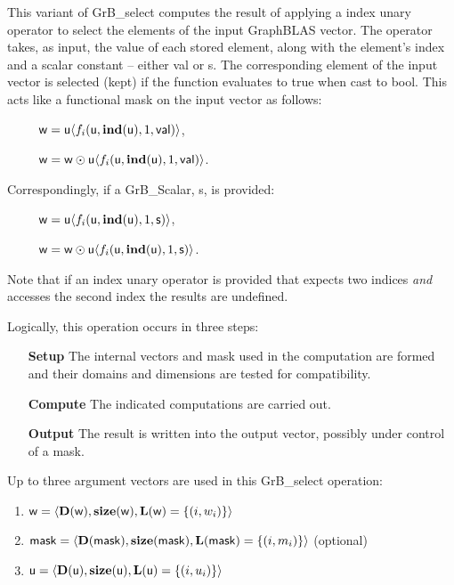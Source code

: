 This variant of {\sf GrB\_select} computes the result of applying a index unary operator
to select the elements of the input GraphBLAS vector.  The operator takes, as input,
the value of each stored element, along with the element's index and a scalar 
constant -- either {\sf val} or {\sf s}.  The corresponding element of the input vector is selected (kept)
if the function evaluates to {\sf true} when cast to {\sf bool}.  This acts like a
functional mask on the input vector as follows:
\begin{itemize}[leftmargin=2.1in]
\item[~] ${\sf w} = {\sf u}\langle f_i({\sf u}, \bold{ind}({\sf u}), 1, {\sf val})\rangle$,
\item[~] ${\sf w} = {\sf w} \odot {\sf u}\langle f_i({\sf u}, \bold{ind}({\sf u}), 1, {\sf val})\rangle$.  
\end{itemize}
{\color{red}
Correspondingly, if a {\sf GrB\_Scalar}, {\sf s}, is provided:
\begin{itemize}[leftmargin=2.1in]
\item[~] ${\sf w} = {\sf u}\langle f_i({\sf u}, \bold{ind}({\sf u}), 1, {\sf s})\rangle$,
\item[~] ${\sf w} = {\sf w} \odot {\sf u}\langle f_i({\sf u}, \bold{ind}({\sf u}), 1, {\sf s})\rangle$.  
\end{itemize}
}
Note that if an index unary operator is provided that expects two indices {\it and} 
accesses the second index the results are undefined.

Logically, this operation occurs in three steps:
\begin{enumerate}[leftmargin=0.75in]
\item[\bf Setup] The internal vectors and mask used in the computation are formed 
and their domains and dimensions are tested for compatibility.
\item[\bf Compute] The indicated computations are carried out.
\item[\bf Output] The result is written into the output vector, possibly under 
control of a mask.
\end{enumerate}

Up to three argument vectors are used in this {\sf GrB\_select} operation:
\begin{enumerate}
    \item ${\sf w} = \langle \bold{D}({\sf w}),\bold{size}({\sf w}),
    \bold{L}({\sf w}) = \{(i,w_i) \} \rangle$

    \item ${\sf mask} = \langle \bold{D}({\sf mask}),\bold{size}({\sf mask}),
    \bold{L}({\sf mask}) = \{(i,m_i) \} \rangle$ (optional)

    \item ${\sf u} = \langle \bold{D}({\sf u}),\bold{size}({\sf u}),
    \bold{L}({\sf u}) = \{(i,u_i) \} \rangle$
\end{enumerate}

